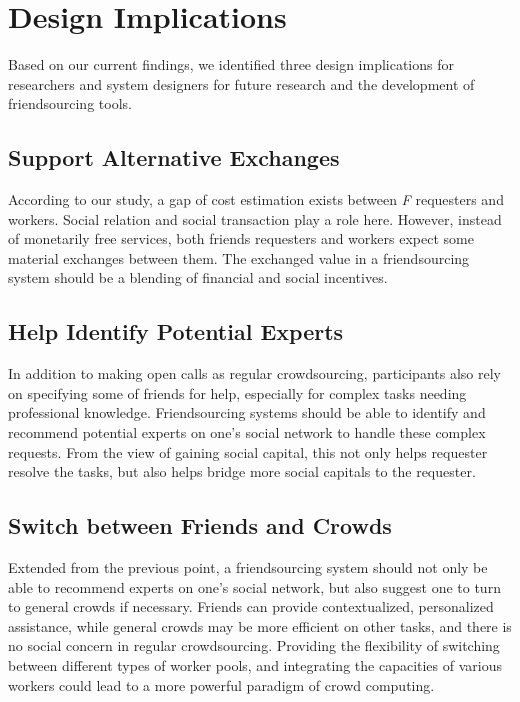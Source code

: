 \section{Design Implications}

Based on our current findings, 
we identified three design implications for researchers and system designers for future research and the development of friendsourcing tools.

\subsection{Support Alternative Exchanges}
According to our study, 
a gap of cost estimation exists between \emph{F} requesters and workers. 
Social relation and social transaction play a role here. 
However, instead of monetarily free services, 
both friends requesters and workers expect some material exchanges between them.
The exchanged value in a friendsourcing system should be a blending of financial and social incentives.

\subsection{Help Identify Potential Experts}
In addition to making open calls as regular crowdsourcing, 
participants also rely on specifying some of friends for help, especially for complex tasks needing professional knowledge.
Friendsourcing systems should be able to identify and recommend potential experts on one's social network to handle these complex requests. 
From the view of gaining social capital, this not only helps requester resolve the tasks, 
but also helps bridge more social capitals to the requester.

\subsection{Switch between Friends and Crowds}
Extended from the previous point, 
a friendsourcing system should not only be able to recommend experts on one's social network, 
but also suggest one to turn to general crowds if necessary. 
Friends can provide contextualized, personalized assistance, 
while general crowds may be more efficient on other tasks, and there is no social concern in regular crowdsourcing. 
Providing the flexibility of switching between different types of worker pools, 
and integrating the capacities of various workers could lead to a more powerful paradigm of crowd computing.







